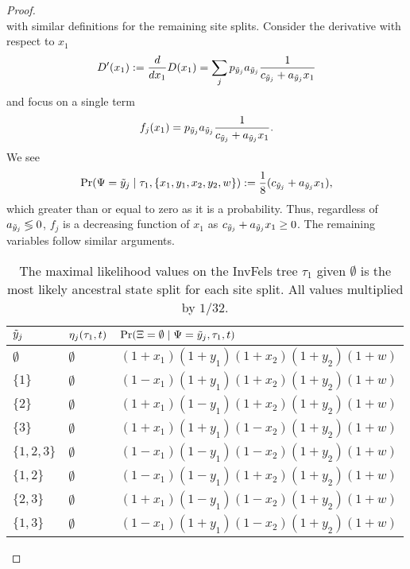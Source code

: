 \begin{proof}
\[\]
with similar definitions for the remaining site splits.
Consider the derivative with respect to $x_1$
\begin{align*}
D'(x_1) := \frac{d}{dx_1} D(x_1) = \sum_j p_{\tilde{y}_j}a_{\tilde{y}_j}\frac{1}{c_{\tilde{y}_j} + a_{\tilde{y}_j}x_1}
\end{align*}
and focus on a single term
\[
f_j(x_1) = p_{\tilde{y}_j}a_{\tilde{y}_j}\frac{1}{c_{\tilde{y}_j} + a_{\tilde{y}_j}x_1}.
\]
We see
\[
\Pr(\Psi=\tilde{y}_j \mid \tau_1,\{x_1,y_1,x_2,y_2,w\}) := \frac{1}{8} (c_{\tilde{y}_j} + a_{\tilde{y}_j}x_1),
\]
which greater than or equal to zero as it is a probability.
Thus, regardless of $a_{\tilde{y}_j} \lessgtr 0$, $f_j$ is a decreasing function of $x_1$ as $c_{\tilde{y}_j} + a_{\tilde{y}_j}x_1 \ge 0$.
The remaining variables follow similar arguments.

\begin{table}
\centering
\begin{tabular}{|ll|l|}
\hline
$\tilde{y}_j$ & $\eta_j(\tau_1, t)$ & $\Pr(\Xi=\emptyset \mid \Psi=\tilde{y}_j,\tau_1,t)$\\
\hline
$\emptyset$&$\emptyset$&$(1+x_1)(1+y_1)(1+x_2)(1+y_2)(1+w)$\\
$\{1\}$    &$\emptyset$&$(1-x_1)(1+y_1)(1+x_2)(1+y_2)(1+w)$\\
$\{2\}$    &$\emptyset$&$(1+x_1)(1-y_1)(1+x_2)(1+y_2)(1+w)$\\
$\{3\}$    &$\emptyset$&$(1+x_1)(1+y_1)(1-x_2)(1+y_2)(1+w)$\\
$\{1,2,3\}$&$\emptyset$&$(1-x_1)(1-y_1)(1-x_2)(1+y_2)(1+w)$\\
$\{1,2\}$  &$\emptyset$&$(1-x_1)(1-y_1)(1+x_2)(1+y_2)(1+w)$\\
$\{2,3\}$  &$\emptyset$&$(1+x_1)(1-y_1)(1-x_2)(1+y_2)(1+w)$\\
$\{1,3\}$  &$\emptyset$&$(1-x_1)(1+y_1)(1-x_2)(1+y_2)(1+w)$\\
\hline
\end{tabular}
\caption{
The maximal likelihood values on the InvFels tree $\tau_1$ given $\emptyset$ is the most likely ancestral state split for each site split.
All values multiplied by $1/32$.}
\label{tab:likelihoods-restricted}
\end{table}


\end{proof}
